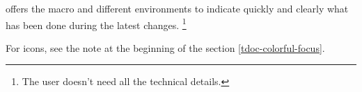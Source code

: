 \thispack{} offers the macro  and different environments to indicate quickly and clearly what has been done during the latest changes.%
\footnote{
    The user doesn't need all the technical details.
}


\begin{tdocnote}
    For icons, see the note at the beginning of the section \ref{tdoc-colorful-focus}.
\end{tdocnote}




\begin{tdocexa}
    \leavevmode


\end{tdocexa}




\begin{tdocexa}
    \leavevmode


\end{tdocexa}




\begin{tdocexa}
    \leavevmode


\end{tdocexa}




\begin{tdocexa}
    \leavevmode


\end{tdocexa}




\begin{tdocexa}
    \leavevmode


\end{tdocexa}




\begin{tdocexa}
    \leavevmode


\end{tdocexa}


